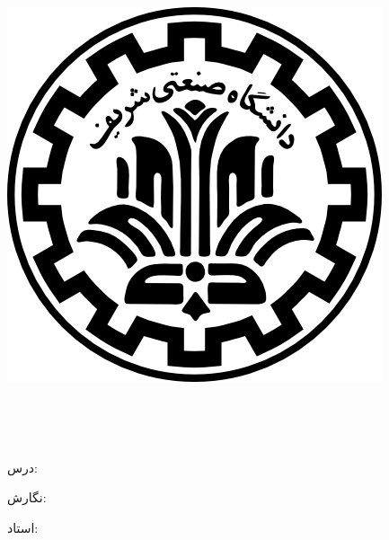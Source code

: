 
\pagestyle{empty}

\begin{center}

\includegraphics[scale=0.2]{front/template/images/logo.png}

\begin{large}

\vspace{-0.2cm}
\ThesisUniversity \\[-0.3em]
\ThesisDepartment

\vspace{0.5cm}

\ThesisType \\[-0.3em]


\end{large}

\vspace{1cm}

{درس:}\\[1.2em]
{\LARGE\textbf{\ThesisTitle}}

\vspace{1cm}

{نگارش:}\\[.5em]
{\large\textbf{\ThesisAuthor}}

\vspace{0.7cm}

{استاد:}\\[.5em]
{\large\textbf{\ThesisSupervisor}}

\vspace{1.3cm}

\ThesisDate

\end{center}

\newpage
